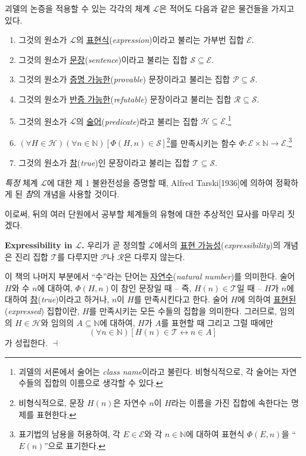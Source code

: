 \documentclass[12pt]{paper}
\newenvironment{context}[1][]
{ \noindent \textbf{{#1}.} }
{ \hfill $ \dashv $ }
\begin{document}
괴델의 논증을 적용할 수 있는 각각의 체계 $\mathcal{L}$은 적어도 다음과 같은 물건들을 가지고 있다.
\begin{enumerate}
\item 그것의 원소가 $\mathcal{L}$의 \underline{표현식}(\textit{expression})이라고 불리는 가부번 집합 $\mathcal{E}$.
\item 그것의 원소가 \underline{문장}(\textit{sentence})이라고 불리는 집합 $\mathcal{S} \subseteq \mathcal{E}$.
\item 그것의 원소가 \underline{증명 가능한}(\textit{provable}) 문장이라고 불리는 집합 $\mathcal{P} \subseteq \mathcal{S}$.
\item 그것의 원소가 \underline{반증 가능한}(\textit{refutable}) 문장이라고 불리는 집합 $\mathcal{R} \subseteq \mathcal{S}$.
\item 그것의 원소가 $\mathcal{L}$의 \underline{술어}(\textit{predicate})라고 불리는 집합 $\mathcal{H} \subseteq \mathcal{E}$.\footnote
{
괴델의 서론에서 술어는 \textit{class name}이라고 불린다.
비형식적으로, 각 술어는 자연수들의 집합의 이름으로 생각할 수 있다.
}
\item $ \left( \forall H \in \mathcal{H} \right) \left( \forall n \in \mathbb{N} \right) \left[ \Phi \left( H , n \right) \in \mathcal{S} \right] $\footnote
{
비형식적으로, 문장 $H \left( n \right)$은 자연수 $n$이 $H$라는 이름을 가진 집합에 속한다는 명제를 표현한다.
}를 만족시키는 함수 $ \Phi : \mathcal{E} \times \mathbb{N} \to \mathcal{E} $.\footnote
{
표기법의 남용을 허용하여, 각 $E \in \mathcal{E}$와 각 $n \in \mathbb{N}$에 대하여 표현식 $\Phi \left( E , n \right)$을 ``$ E \left( n \right) $''으로 표기한다.
}
\item 그것의 원소가 \underline{참}(\textit{true})인 문장이라고 불리는 집합 $\mathcal{T} \subseteq \mathcal{S}$.
\end{enumerate}
\textit{특정} 체계 $\mathcal{L}$에 대한 제 1 불완전성을 증명할 때,
Alfred Tarski[1936]에 의하여 정확하게 된 \textit{참}의 개념을 사용할 것이다.

이로써, 뒤의 여러 단원에서 공부할 체계들의 유형에 대한 추상적인 묘사를 마무리 짓겠다.

\begin{context}[Expressibility in $\mathcal{L}$]
우리가 곧 정의할 $\mathcal{L}$에서의 \underline{표현 가능성}(\textit{expressibility})의 개념은 진리 집합 $\mathcal{T}$를 다루지만 $\mathcal{P}$나 $\mathcal{R}$은 다루지 않는다.

이 책의 나머지 부분에서 ``수''라는 단어는 \underline{자연수}(\textit{natural number})를 의미한다.
술어 $H$와 수 $n$에 대하여, $\Phi \left( H , n \right)$이 참인 문장일 때 --
즉, $ H \left( n \right) \in \mathcal{T} $일 때 --
$H$가 $n$에 대하여 \underline{참}(\textit{true})이라고 하거나,
$n$이 $H$를 만족시킨다고 한다.
술어 $H$에 의하여 \underline{표현된}(\textit{expressed}) 집합이란, $H$를 만족시키는 모든 수들의 집합을 의미한다.
그러므로, 임의의 $H \in \mathcal{H}$와 임의의 $A \subseteq \mathbb{N}$에 대하여,
$H$가 $A$를 표현할 때 그리고 그럴 때에만 $$ \left( \forall n \in \mathbb{N} \right) \left[ H \left( n \right) \in \mathcal{T} \leftrightarrow n \in A \right] $$가 성립한다.
\end{context}
\end{document}

